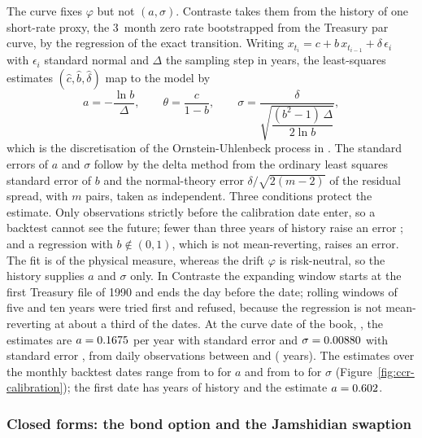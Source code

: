 The curve fixes $\varphi$ but not $(a,\sigma)$. Contraste takes them from the history of one short-rate proxy, the 3~month zero rate bootstrapped
from the Treasury par curve, by the regression of the exact transition. Writing $x_{t_i}=c+b\,x_{t_{i-1}}+\delta\,\epsilon_i$ with $\epsilon_i$ standard
normal and $\Delta$ the sampling step in years, the least-squares estimates $(\hat c,\hat b,\hat\delta)$ map to the model by
\begin{equation}
a=-\frac{\ln b}{\Delta},\qquad \theta=\frac{c}{1-b},\qquad
\sigma=\frac{\delta}{\sqrt{\dfrac{(b^{2}-1)\,\Delta}{2\ln b}}},
\label{eq:ccr-ar1}
\end{equation}
which is the discretisation of the Ornstein-Uhlenbeck process in \citet{ccr:brigo2008}. The standard errors of $a$ and $\sigma$ follow by the delta method from the
ordinary least squares standard error of $b$ and the normal-theory error $\delta/\sqrt{2(m-2)}$ of the residual spread, with $m$ pairs, taken as independent. Three
conditions protect the estimate. Only observations strictly before the calibration date enter, so a backtest cannot see the future; fewer than
three years of history raise an error \citep[CRE53.51]{ccr:cre53}; and a regression with $b\notin(0,1)$, which is not mean-reverting, raises an error. The fit is of the physical
measure, whereas the drift $\varphi$ is risk-neutral, so the history supplies $a$ and $\sigma$ only. In Contraste the expanding window starts at the first
Treasury file of 1990 and ends the day before the date; rolling windows of five and ten years were tried first and refused, because the regression is not
mean-reverting at about a third of the dates. At the curve date of the book, \ccrCurveDate, the estimates are $a=0.1675$ per year with standard error
\ccrHwASe{} and $\sigma=0.00880$ with standard error \ccrHwSigmaSe, from \ccrNObs{} daily observations between \ccrSampleStart{} and \ccrSampleEnd{}
(\ccrHistYears{} years). The estimates over the \ccrCalDates{} monthly backtest dates range from \ccrCalAMin{} to \ccrCalAMax{} for $a$ and from \ccrCalSigmaMin{}
to \ccrCalSigmaMax{} for $\sigma$ (Figure~\ref{fig:ccr-calibration}); the first date has \ccrCalFirstYears{} years of history and the estimate $a=0.602$.

\subsubsection{Closed forms: the bond option and the Jamshidian swaption}

